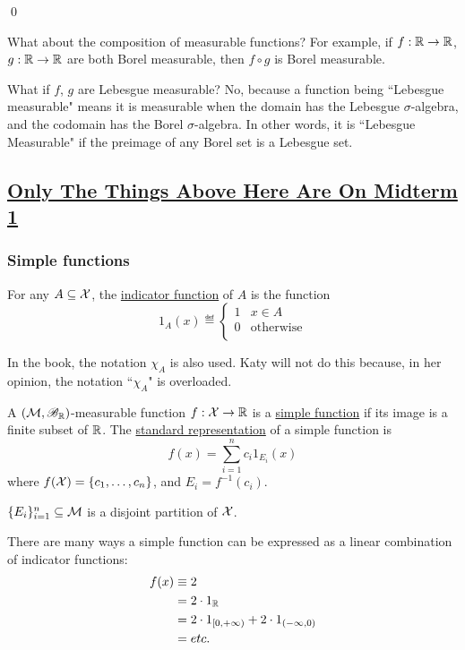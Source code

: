 \documentclass[x11names,reqno,14pt]{extarticle}
\newcommand*{\oo}{\infty}
\begin{document}
\qed

\rem 

What about the composition of measurable functions? For example, if $f:\mathbb{R}\to\mathbb{R}$, $g:\mathbb{R}\to\mathbb{R}$ are both Borel measurable, then $f \circ g$ is Borel measurable. 

What if $f$, $g$ are Lebesgue measurable? No, because a function being ``Lebesgue measurable" means it is measurable when the domain has the Lebesgue $\sigma$-algebra, and the codomain has the Borel $\sigma$-algebra. In other words, it is ``Lebesgue Measurable" if the preimage of any Borel set is a Lebesgue set.

\subsection*{\underline{Only The Things Above Here Are On Midterm 1}}

\subsubsection*{Simple functions}


For any $A \subseteq \mathcal{X}$, the \underline{indicator function} of $A$ is the function 
\[
1_A(x) \eqdef \begin{cases} 1 & x \in A \\ 0 & \text{otherwise} \\ \end{cases}
\]

In the book, the notation $\chi_A$ is also used. Katy will not do this because, in her opinion, the notation ``$\chi_A$" is overloaded. 


A $(\mathcal{M}, \mathscr{B}_{\mathbb{R}})$-measurable function $f:\mathcal{X}\to\mathbb{R}$ is a \underline{simple function} if its image is a finite subset of $\mathbb{R}$. The \underline{standard representation} of a simple function is 
\[
f(x) = \sum_{i=1}^nc_i1_{E_i}(x)
\]
where $f(\mathcal{X}) = \{c_1, \dots, c_n\}$, and $E_i = f^{-1}(c_i)$. 

\rem

$\{E_i\}_{i=1}^n\subseteq\mathcal{M}$ is a disjoint partition of $\mathcal{X}$. 

\exm

There are many ways a simple function can be expressed as a linear combination of indicator functions: 
\begin{align*}
f(x) & \equiv 2 \\
& = 2\cdot1_{\R} \\
& = 2\cdot1_{[0, +\oo)} + 2\cdot1_{(-\oo, 0)} \\
& = etc. \\
\end{align*}
\end{document}
